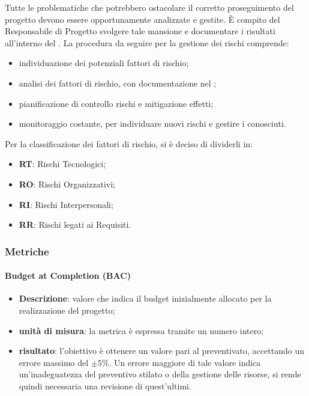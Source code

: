 			
			Tutte le problematiche che potrebbero ostacolare il corretto proseguimento del progetto devono essere opportunamente analizzate e gestite. È compito del Responsabile di Progetto svolgere tale mansione e documentare i risultati all'interno del . La procedura da seguire per la gestione dei rischi comprende:
			\begin{itemize}
				\item individuazione dei potenziali fattori di rischio;
				\item analisi dei fattori di rischio, con documentazione nel ;
				\item pianificazione di controllo rischi e mitigazione effetti;
				\item monitoraggio costante, per individuare nuovi rischi e gestire i conosciuti.
			\end{itemize}
			Per la classificazione dei fattori di rischio, si è deciso di dividerli in:
			\begin{itemize}
				\item \textbf{RT}: Rischi Tecnologici;
				\item \textbf{RO}: Rischi Organizzativi;
				\item \textbf{RI}: Rischi Interpersonali;
				\item \textbf{RR}: Rischi legati ai Requisiti.
			\end{itemize}
		\subsubsection{Metriche}
				\paragraph{Budget at Completion (BAC)}
					\begin{itemize}
						\item \textbf{Descrizione}: valore che indica il budget inizialmente allocato per la realizzazione del progetto;
						\item \textbf{unità di misura}: la metrica è espressa tramite un numero intero;
						\item \textbf{risultato}: l'obiettivo è ottenere un valore pari al preventivato, accettando un errore massimo del $\pm{}5\%$. Un errore maggiore di tale valore indica un'inadeguatezza del preventivo stilato o della gestione delle risorse, si rende quindi necessaria una revisione di quest'ultimi.
					\end{itemize}
